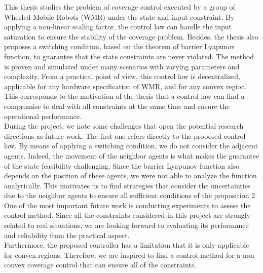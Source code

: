 This thesis studies the problem of coverage control executed by a group of Wheeled Mobile Robots (WMR) under the state and input constraint. By applying a non-linear scaling factor, the control law can handle the input saturation to ensure the stability of the coverage problem. Besides, the thesis also proposes a switching condition, based on the theorem of barrier Lyapunov function, to guarantee that the state constraints are never violated. The method is proven and simulated under many scenarios with varying parameters and complexity. From a practical point of view, this control law is decentralized, applicable for any hardware specification of WMR,
and for any convex region. This corresponds to the motivation of the thesis that a control law can find a compromise to deal with all constraints at the same time and ensure the operational performance. \\
During the project, we note some challenges that open the potential research directions as future work. The first one refers directly to the proposed control law. By
means of applying a switching condition, we do not consider the adjacent agents. Indeed, the movement of the neighbor agents is what makes the guarantee of the state feasibility challenging. Since the barrier Lyapunov function also depends on the position of these agents, we were not able to analyze the function analytically. This motivates us to find strategies that consider the uncertainties due to the neighbor agents to ensure all sufficient conditions of the proposition 2. \\
One of the most important future work is conducting experiments to assess the control method. Since all the constraints considered in this project are strongly
related to real situations, we are looking forward to evaluating its performance and reliability from the practical aspect. \\
Furthermore, the proposed controller has a limitation that it is only applicable for convex regions. Therefore, we are inspired to find a control method for a non-convex coverage control that can ensure all of the constraints. \\
